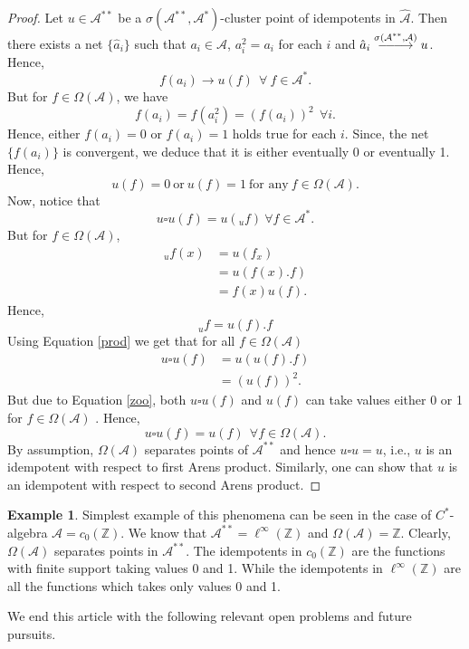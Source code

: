 \documentclass[10pt]{article}
\theoremstyle{definition}
\newtheorem{example}{Example}[section]
\DeclareRobustCommand{\looongrightarrow}{%
	\DOTSB\relbar\joinrel\relbar\joinrel\relbar\joinrel\rightarrow}
\begin{document}
	\begin{proof}
		Let $u\in \mathcal A^{**}$ be a $\sigma(\mathcal A^{**},\mathcal A^*)$-cluster point of idempotents in $\hat{\mathcal A}$. Then there exists a net $\{\hat{a}_i\}$ such that $a_i\in \mathcal A$, $a_i^2=a_i$ for each $i$ and $\hat{a}_i\overset{\sigma(\mathcal A^{**},\mathcal A)}{\looongrightarrow} u$. Hence, 
		\begin{equation}
			f(a_i)\to u(f)~~\forall~f\in \mathcal A^*.
		\end{equation}
		But for $f\in \Omega(\mathcal A)$, we have $$f(a_i)=f(a_i^2)=(f(a_i))^2~~\forall i.$$
		Hence, either $f(a_i)=0$ or $f(a_i)=1$ holds true for each $i$. Since, the net $\{f(a_i)\}$ is convergent, we deduce that it is either eventually 0 or eventually 1. Hence, \begin{equation}\label{zoo}
			u(f)=0 ~\text{or}~ u(f)=1 ~\text{for any}~f\in \Omega(\mathcal A).
		\end{equation}
		Now, notice that
		\begin{equation}\label{prod}
			u\square u(f)=u({}_{u}f) ~\forall f\in \mathcal A^*.
		\end{equation}
		But for $f\in \Omega(\mathcal A)$, \begin{align*}
			{}_{u}f(x)&=u(f_x)\\
			&=u\left(f(x).f\right)\\
			&=f(x)u(f).
		\end{align*}
		Hence, \begin{equation}
			{}_{u}f=u(f).f
		\end{equation}
		Using Equation \ref{prod} we get that for all $f\in \Omega (\mathcal A)$ \begin{align*}
			u\square u(f)&=u(u(f).f)\\
			&=\left(u(f)\right)^2.
		\end{align*}
		But due to Equation \ref{zoo}, both $u\square u(f)$ and $u(f)$ can take values either 0 or 1 for $f\in \Omega(\mathcal A)$ . Hence, \begin{equation}
			u\square u(f)=u(f) ~~\forall f\in \Omega(\mathcal A).
		\end{equation}
		By assumption, $\Omega(\mathcal A)$ separates points of $\mathcal A^{**}$ and hence $u\square u=u$, i.e., $u$ is an idempotent with respect to first Arens product. Similarly, one can show that $u$ is an idempotent with respect to second Arens product.
	\end{proof}
	\begin{example}
		Simplest example of this phenomena can be seen in the case of $C^*$-algebra $\mathcal A=c_0(\mathbb Z)$. We know that $\mathcal A^{**}=\ell^\infty(\mathbb Z)$ and $\Omega(\mathcal A)=\mathbb Z$. Clearly, $\Omega(\mathcal A)$ separates points in $\mathcal A^{**}$. The idempotents in $c_0(\mathbb Z)$ are the functions with finite support taking values 0 and 1. While the idempotents in $\ell^\infty(\mathbb Z)$ are all the functions which takes only values 0 and 1.
	\end{example}
	\noindent We end this article with the following relevant open problems and future pursuits.\\
	
\end{document}
